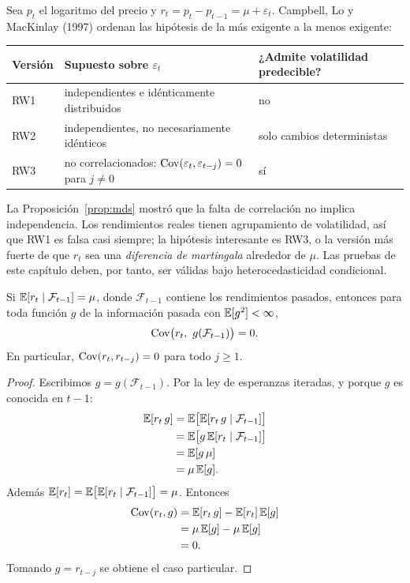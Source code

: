 Sea $p_t$ el logaritmo del precio y $r_t=p_t-p_{t-1}=\mu+\varepsilon_t$. Campbell, Lo y MacKinlay (1997)
ordenan las hipótesis de la más exigente a la menos exigente:
\begin{center}\small
\begin{tabular}{@{}lll@{}}
\toprule
Versión & Supuesto sobre $\varepsilon_t$ & ¿Admite volatilidad predecible? \\
\midrule
RW1 & independientes e idénticamente distribuidos & no \\
RW2 & independientes, no necesariamente idénticos & solo cambios deterministas \\
RW3 & no correlacionados: $\operatorname{Cov}(\varepsilon_t,\varepsilon_{t-j})=0$ para $j\ne0$ & sí \\
\bottomrule
\end{tabular}
\end{center}
La Proposición~\ref{prop:mds} mostró que la falta de correlación no implica independencia. Los rendimientos
reales tienen agrupamiento de volatilidad, así que RW1 es falsa casi siempre; la hipótesis interesante es RW3,
o la versión más fuerte de que $r_t$ sea una \emph{diferencia de martingala} alrededor de $\mu$. Las pruebas de
este capítulo deben, por tanto, ser válidas bajo heterocedasticidad condicional.

\begin{proposicion}\label{prop:martingala}
Si $\mathbb{E}[r_t\mid\mathcal F_{t-1}]=\mu$, donde $\mathcal F_{t-1}$ contiene los rendimientos pasados, entonces para
toda función $g$ de la información pasada con $\mathbb{E}[g^2]<\infty$,
\[
  \operatorname{Cov}\bigl(r_t,\ g(\mathcal F_{t-1})\bigr)=0 .
\]
En particular, $\operatorname{Cov}(r_t,r_{t-j})=0$ para todo $j\ge1$.
\end{proposicion}

\begin{proof}
Escribimos $g=g(\mathcal F_{t-1})$. Por la ley de esperanzas iteradas, y porque $g$ es conocida en $t-1$:
\begin{align*}
  \mathbb{E}[r_t\,g] &= \mathbb{E}\bigl[\mathbb{E}[r_t\,g\mid\mathcal F_{t-1}]\bigr]\\
             &= \mathbb{E}\bigl[g\,\mathbb{E}[r_t\mid\mathcal F_{t-1}]\bigr]\\
             &= \mathbb{E}[g\,\mu]\\
             &= \mu\,\mathbb{E}[g].
\end{align*}
Además $\mathbb{E}[r_t]=\mathbb{E}\bigl[\mathbb{E}[r_t\mid\mathcal F_{t-1}]\bigr]=\mu$. Entonces
\begin{align*}
  \operatorname{Cov}(r_t,g) &= \mathbb{E}[r_t\,g]-\mathbb{E}[r_t]\,\mathbb{E}[g]\\
              &= \mu\,\mathbb{E}[g]-\mu\,\mathbb{E}[g]\\
              &= 0 .
\end{align*}
Tomando $g=r_{t-j}$ se obtiene el caso particular.
\end{proof}

